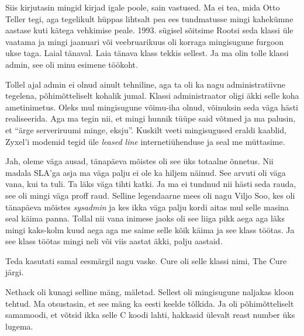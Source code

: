 Siis kirjutasin mingid kirjad igale poole, sain vastused. Ma ei tea, mida Otto 
Teller tegi, aga tegelikult hüppas lihtsalt pea ees tundmatusse mingi kahekümne 
aastase kuti kätega vehkimise peale. 1993. sügisel sõitsime Rootsi seda klassi 
üle vaatama ja mingi jaanuari või veebruarikuus oli korraga mingisugune furgoon 
ukse taga. Laial tänaval. Laia tänava klass tekkis sellest. Ja ma olin tolle klassi admin, see oli minu 
esimene töökoht.

Tollel ajal admin ei olnud ainult  tehniline, aga ta oli ka nagu 
administratiivne tegelena, põhimõtteliselt kohalik jumal. Klassi administraator 
oligi äkki selle koha ametinimetus. Oleks mul mingisugune võimu-iha olnud, 
võinuksin seda väga hästi realiseerida. Aga ma tegin nii, et mingi hunnik tüüpe 
said võtmed ja ma palusin, et \enquote{ärge serveriruumi minge, eksju}. Kuskilt 
veeti mingisugused eraldi kaablid, Zyxel'i modemid tegid üle \emph{leased line} 
internetiühenduse  ja seal me müttasime.

Jah, oleme väga ausad, tänapäeva mõistes oli see üks totaalne õnnetus. Nii 
madala SLA'ga asja ma  väga palju ei ole ka hiljem näinud. See arvuti oli väga 
vana, kui ta tuli. Ta läks väga tihti katki. Ja ma ei tundnud nii hästi seda 
rauda, see oli mingi väga proff raud. Selline legendaarne mees oli nagu Viljo 
Soo, kes oli tänapäeva mõistes \emph{sysadmin} ja kes 
ikka  väga palju kordi aitas mul selle masina seal käima panna. Tollal nii vana 
inimese jaoks oli see liiga pikk aega aga läks mingi kaks-kolm kuud aega aga me 
saime selle kõik käima ja see klass töötas. Ja see klass töötas mingi neli või 
viis aastat äkki, palju aastaid. 

Teda kasutati  samal eesmärgil nagu vaske. Cure oli selle klassi nimi, The Cure 
järgi. 

Nethack oli kunagi selline mäng, mäletad. Sellest oli 
mingisugune naljakas kloon tehtud. Ma otsustasin, et see mäng ka eesti keelde 
tõlkida. Ja oli põhimõtteliselt samamoodi, et võtsid ikka selle C koodi lahti, 
hakkasid ülevalt reast number üks lugema.


